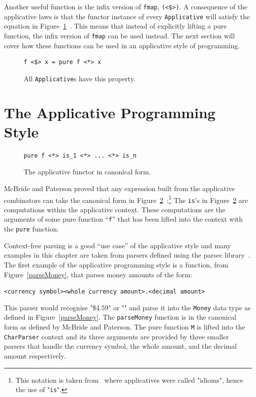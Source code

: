 Another useful function is the infix version of \texttt{fmap}, \texttt{(<\$>)}. A consequence of the applicative laws is that the functor instance of every \texttt{Applicative} will satisfy the equation in  Figure~\ref{fmapLaw}~\citep{control.applicative}. This means that instead of explicitly lifting a pure function, the infix version of \texttt{fmap} can be used instead. The next section will cover how these functions can be used in an applicative style of programming.

\begin{figure}[t]
\begin{lstlisting}
f <$> x = pure f <*> x
\end{lstlisting}
\caption{All \texttt{Applicative}s have this property.}
\label{fmapLaw}
\end{figure}

\section{The Applicative Programming Style}
\label{sec:appProgStyle}

\begin{figure}[t]
\begin{lstlisting}
pure f <*> is_1 <*> ... <*> is_n
\end{lstlisting}
\caption{The applicative functor in canonical form.}
\label{canonForm}
\end{figure}

McBride and Paterson proved that any expression built from the applicative combinators can take the canonical form in Figure~\ref{canonForm}~\citep{mcbrideIdioms}:\footnote{This notation is taken from~\citep{mcbrideIdioms} where applicatives were called "idioms", hence the use of "\texttt{is}".} The \texttt{is}'s in Figure~\ref{canonForm} are computations within the applicative context. These computations are the arguments of some pure function ``\texttt{f}'' that has been lifted into the context with the \texttt{pure} function. 

Context-free parsing is a good ``use case'' of the applicative style and many examples in this chapter are taken from parsers defined using the parsec library~\citep{parsec}. The first example of the applicative programming style is a function, from Figure~\ref{parseMoney}, that parses money amounts of the form:
 
 \texttt{<currency symbol><whole currency amount>.<decimal amount>}
  
This parser would recognise "\$4.59" or "" and parse it into the \texttt{Money} data type as defined in Figure~\ref{parseMoney}. The \texttt{parseMoney} function is in the canonical form as defined by McBride and Paterson. The pure function \texttt{M} is lifted into the \texttt{CharParser} context and its three arguments are provided by three smaller parsers that handle the currency symbol, the whole amount, and the decimal amount respectively. 


